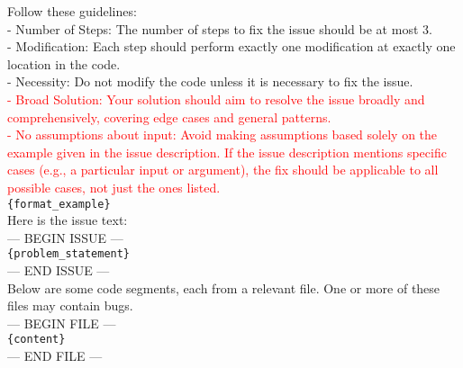 \begin{tcolorbox}[colback=white, colframe=black]
Follow these guidelines:\\
- Number of Steps: The number of steps to fix the issue should be at most 3.\\ 
- Modification: Each step should perform exactly one modification at exactly one location in the code.\\
- Necessity: Do not modify the code unless it is necessary to fix the issue.\\
\textcolor{red}{- Broad Solution: Your solution should aim to resolve the issue broadly and comprehensively, covering edge cases and general patterns.}\\
\textcolor{red}{- No assumptions about input: Avoid making assumptions based solely on the example given in the issue description. If the issue description mentions specific cases (e.g., a particular input or argument), the fix should be applicable to all possible cases, not just the ones listed.}\\


\texttt{\{format\_example\}}\\

Here is the issue text:\\
--- BEGIN ISSUE ---\\
\texttt{\{problem\_statement\}}\\
--- END ISSUE ---\\

Below are some code segments, each from a relevant file. One or more of these files may contain bugs.\\
--- BEGIN FILE ---\\
\texttt{\{content\}}\\
--- END FILE ---\\
\end{tcolorbox}